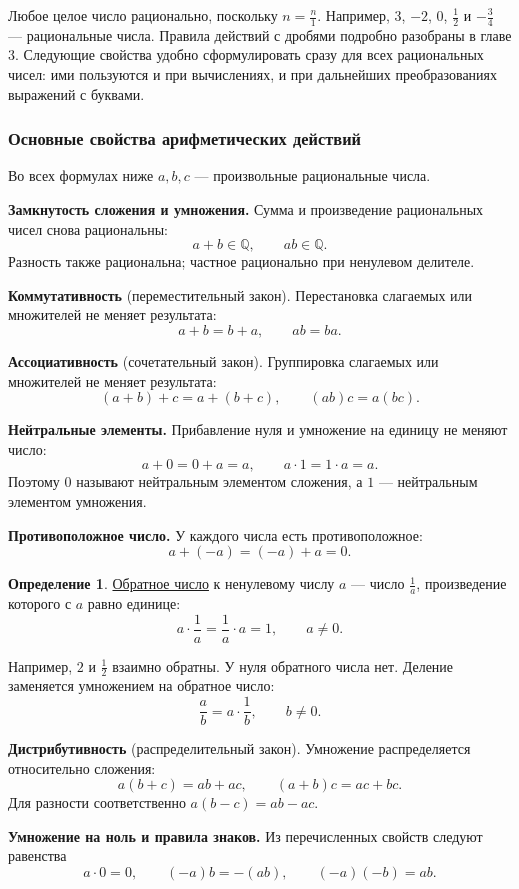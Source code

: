 \documentclass[12pt,a4paper]{article}
\theoremstyle{definition}
\newtheorem{definition}{Определение}[section]
\theoremstyle{plain}
\theoremstyle{remark}
\newcommand{\term}[1]{\uline{#1}}
\begin{document}
Любое целое число рационально, поскольку \(n=\frac n1\).
Например, \(3\), \(-2\), \(0\), \(\frac12\) и \(-\frac34\) --- рациональные числа.
Правила действий с дробями подробно разобраны в главе 3.
Следующие свойства удобно сформулировать сразу для всех рациональных чисел:
ими пользуются и при вычислениях, и при дальнейших преобразованиях выражений с буквами.

\subsubsection*{Основные свойства арифметических действий}

Во всех формулах ниже \(a,b,c\) --- произвольные рациональные числа.

\textbf{Замкнутость сложения и умножения.}
Сумма и произведение рациональных чисел снова рациональны:
\[
a+b\in\mathbb Q,\qquad ab\in\mathbb Q.
\]
Разность также рациональна; частное рационально при ненулевом делителе.

\textbf{Коммутативность} (переместительный закон).
Перестановка слагаемых или множителей не меняет результата:
\[
a+b=b+a,\qquad ab=ba.
\]

\textbf{Ассоциативность} (сочетательный закон).
Группировка слагаемых или множителей не меняет результата:
\[
(a+b)+c=a+(b+c),\qquad (ab)c=a(bc).
\]

\textbf{Нейтральные элементы.}
Прибавление нуля и умножение на единицу не меняют число:
\[
a+0=0+a=a,\qquad a\cdot1=1\cdot a=a.
\]
Поэтому \(0\) называют нейтральным элементом сложения,
а \(1\) --- нейтральным элементом умножения.

\textbf{Противоположное число.}
У каждого числа есть противоположное:
\[
a+(-a)=(-a)+a=0.
\]

\begin{definition}
\term{Обратное число} к ненулевому числу \(a\) --- число \(\frac1a\),
произведение которого с \(a\) равно единице:
\[
a\cdot\frac1a=\frac1a\cdot a=1,\qquad a\ne0.
\]
\end{definition}
Например, \(2\) и \(\frac12\) взаимно обратны.
У нуля обратного числа нет. Деление заменяется умножением на обратное число:
\[
\frac ab=a\cdot\frac1b,\qquad b\ne0.
\]

\textbf{Дистрибутивность} (распределительный закон).
Умножение распределяется относительно сложения:
\[
a(b+c)=ab+ac,\qquad (a+b)c=ac+bc.
\]
Для разности соответственно \(a(b-c)=ab-ac\).

\textbf{Умножение на ноль и правила знаков.}
Из перечисленных свойств следуют равенства
\[
a\cdot0=0,\qquad (-a)b=-(ab),\qquad (-a)(-b)=ab.
\]
\end{document}
